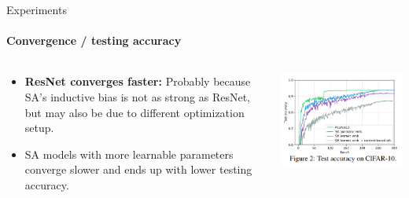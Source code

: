 \documentclass[9pt]{beamer}
\begin{document}
\begin{frame}{Experiments}
\framesubtitle{Convergence / testing accuracy}
\begin{columns}
\begin{column}{0.43\textwidth}
  \begin{itemize}
    \item \textbf{ResNet converges faster:} Probably because SA's inductive bias is not as strong as ResNet, but may also be due to different optimization setup.
    
    \vspace{.1in}
    \item SA models with more learnable parameters converge slower and ends up with lower testing accuracy.  
  \end{itemize}
\end{column}
\begin{column}{0.55\textwidth} \centering
  \includegraphics[width=\textwidth]{presentation/images/converge_test_acc.png}
\end{column}
\end{columns}
\end{frame}
\end{document}
